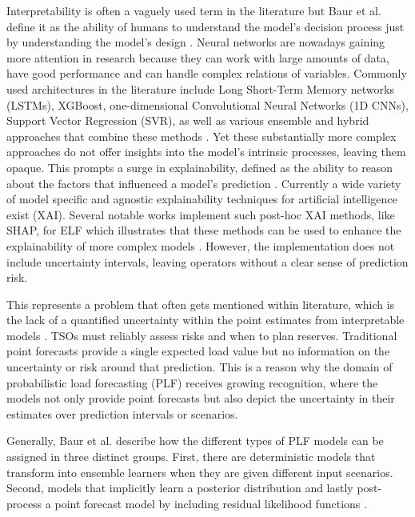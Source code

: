 \documentclass[Master,english,IEEE]{twbook}
\begin{document}
Interpretability is often a vaguely used term in the literature but Baur et al. define it as the ability of humans to understand the model's decision process just by understanding the model's design \cite{baurExplainabilityInterpretabilityElectric2024}. Neural networks are nowadays gaining more attention in research because they can work with large amounts of data, have good performance and can handle complex relations of variables. Commonly used architectures in the literature include Long Short-Term Memory networks (LSTMs), XGBoost, one-dimensional Convolutional Neural Networks (1D CNNs), Support Vector Regression (SVR), as well as various ensemble and hybrid approaches that combine these methods \cite{andriopoulosShortTermElectric2021,yaprakdalMultivariateTimeSeries2023,liPowerLoadForecasting2022,bashirShortTermElectricity2022,simEXplainableAIXAIBased2022}. Yet these substantially more complex approaches do not offer insights into the model's intrinsic processes, leaving them opaque. This prompts a surge in explainability, defined as the ability to reason about the factors that influenced a model's prediction \cite{baurExplainabilityInterpretabilityElectric2024}. Currently a wide variety of model specific and agnostic explainability techniques for artificial intelligence exist (XAI). Several notable works implement such post-hoc XAI methods, like SHAP, for ELF which illustrates that these methods can be used to enhance the explainability of more complex models \cite{wuExplainableFrameworkLoad2022, liPowerLoadForecasting2022}. However, the implementation does not include uncertainty intervals, leaving operators without a clear sense of prediction risk.

This represents a problem that often gets mentioned within literature, which is the lack of a quantified uncertainty within the point estimates from interpretable models \cite{baurExplainabilityInterpretabilityElectric2024,bazionisReviewDeterministicProbabilistic2021}. TSOs must reliably assess risks and when to plan reserves. Traditional point forecasts provide a single expected load value but no information on the uncertainty or risk around that prediction. This is a reason why the domain of probabilistic load forecasting (PLF) receives growing recognition, where the models not only provide point forecasts but also depict the uncertainty in their estimates over prediction intervals or scenarios.

Generally, Baur et al. describe how the different types of PLF models can be assigned in three distinct groups. First, there are deterministic models that transform into ensemble learners when they are given different input scenarios. Second, models that implicitly learn a posterior distribution and lastly post-process a point forecast model by including residual likelihood functions \cite{baurExplainabilityInterpretabilityElectric2024}.
\end{document}
